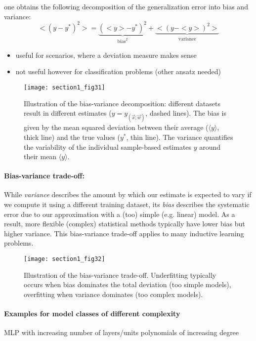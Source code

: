 one obtains the following decomposition of the generalization error
into bias and variance:
\begin{equation}
	\big< (y - y^*)^2 \big> = 
		\underbrace{(<y> - y^*)^2}_{\text{bias}^2}
		+ \underbrace{\big< (y - <y>)^2 \big>}_{\text{variance}}
\end{equation}
\begin{itemize}
\item useful for scenarios, where a deviation measure makes sense
\item not useful however for classification problems (other
  ansatz needed)
\end{itemize}

\begin{figure}[h]
  \centering
  \texttt{[image: section1\_fig31]}  
  \caption{Illustration of the bias-variance decomposition: different
    datasets result in different estimates ($y=y_{(\vec{x};\vec{w})}$,
    dashed lines). The bias is given by the mean squared deviation
    between their average ($\langle y \rangle$, thick line) and the
    true values ($y^*$, thin line). The variance quantifies the
    variability of the individual sample-based estimates $y$ around
    their mean $\langle y \rangle$.}
  \label{fig:bias-variance}
\end{figure}

\paragraph{Bias-variance trade-off:} While \emph{variance} describes
the amount by which our estimate is expected to vary if we compute it
using a different training dataset, its \emph{bias} describes the
systematic error due to our approximation with a (too) simple
(e.g. linear) model. As a result, more flexible (complex) statistical
methods typically have lower bias but higher variance. This
bias-variance trade-off applies to many inductive learning problems.
\begin{figure}[h]
    \centering
    \texttt{[image: section1\_fig32]}    
    \caption{Illustration of the bias-variance trade-off. Underfitting
      typically occurs when bias dominates the total deviation
      (too simple models), overfitting when variance dominates (too
      complex models).}
    \label{fig:bias-variance-tradeoff}
  \end{figure}
\paragraph{Examples for model classes of different complexity}
\begin{itemize}
	\itr MLP with increasing number of layers/units
	\itr polynomials of increasing degree
\end{itemize}

